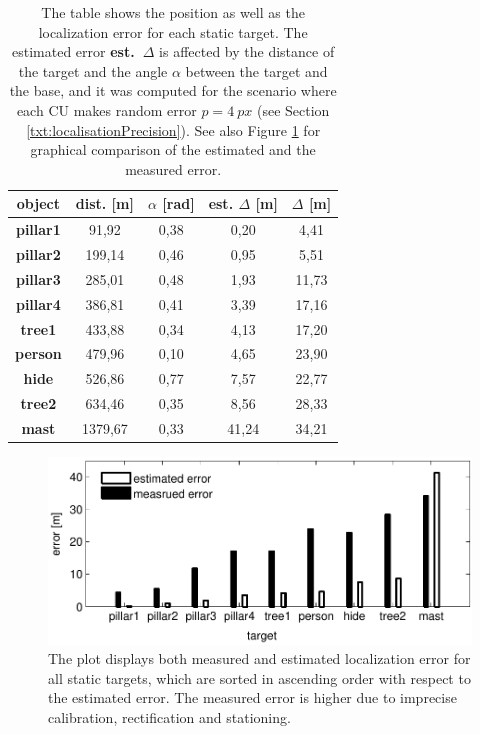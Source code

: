 \begin{table}[htbp]
	\centering
	\caption{The table shows the position as well as the localization error for each static target. The estimated error \textbf{est.~$\Delta$} is affected by the distance of the target and the angle $\alpha$ between the target and the base, and it was computed for the scenario where each CU makes random error $p = 4~px$ (see Section \ref{txt:localisationPrecision}). See also Figure \ref{fig:plotErrorFixedTargets} for graphical comparison of the estimated and the measured error.}
	\begin{tabular}{ccccc}
		\toprule
		\textbf{object} & \textbf{dist. [m]} & \textbf{$\alpha$ [rad]} & \textbf{est. $\Delta$ [m]} & \textbf{$\Delta$ [m]} \\
		\midrule
		\textbf{pillar1} & 91,92 & 0,38  & 0,20  & 4,41 \\
		\textbf{pillar2} & 199,14 & 0,46  & 0,95  & 5,51 \\
		\textbf{pillar3} & 285,01 & 0,48  & 1,93  & 11,73 \\
		\textbf{pillar4} & 386,81 & 0,41  & 3,39  & 17,16 \\
		\textbf{tree1} & 433,88 & 0,34  & 4,13  & 17,20 \\
		\textbf{person} & 479,96 & 0,10  & 4,65  & 23,90 \\
		\textbf{hide} & 526,86 & 0,77  & 7,57  & 22,77 \\
		\textbf{tree2} & 634,46 & 0,35  & 8,56  & 28,33 \\
		\textbf{mast} & 1379,67 & 0,33  & 41,24 & 34,21 \\
		\bottomrule
	\end{tabular}
	\label{tab:staticTargets}
\end{table}

\begin{figure}[htb]\centering
	\centering
	\includegraphics[width=0.65\linewidth]{fig/fixed_target_estimation_error.pdf}
	\caption{The plot displays both measured and estimated localization error for all static targets, which are sorted in ascending order with respect to the estimated error. The measured error is higher due to imprecise calibration, rectification and stationing.}
	\label{fig:plotErrorFixedTargets}
\end{figure}


